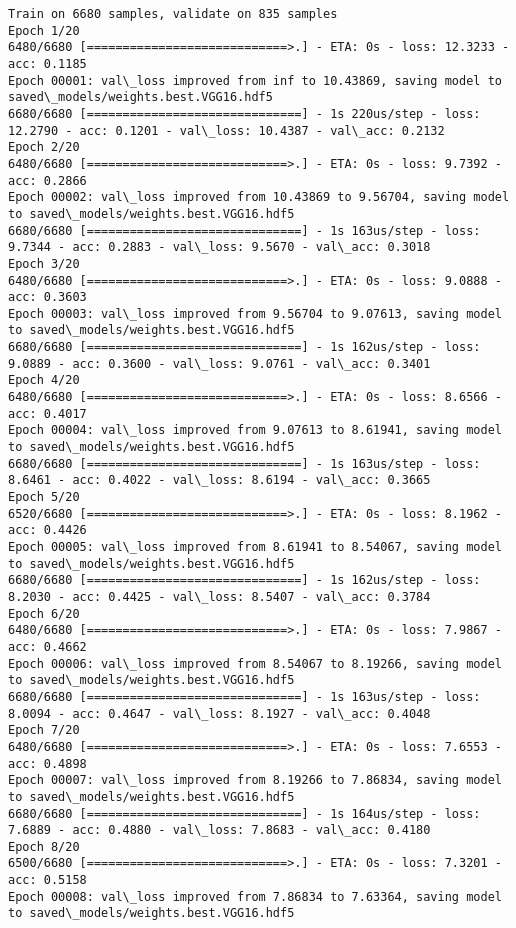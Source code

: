 \documentclass[11pt]{article}
\begin{document}
    \begin{Verbatim}[commandchars=\\\{\}]
Train on 6680 samples, validate on 835 samples
Epoch 1/20
6480/6680 [============================>.] - ETA: 0s - loss: 12.3233 - acc: 0.1185
Epoch 00001: val\_loss improved from inf to 10.43869, saving model to saved\_models/weights.best.VGG16.hdf5
6680/6680 [==============================] - 1s 220us/step - loss: 12.2790 - acc: 0.1201 - val\_loss: 10.4387 - val\_acc: 0.2132
Epoch 2/20
6480/6680 [============================>.] - ETA: 0s - loss: 9.7392 - acc: 0.2866
Epoch 00002: val\_loss improved from 10.43869 to 9.56704, saving model to saved\_models/weights.best.VGG16.hdf5
6680/6680 [==============================] - 1s 163us/step - loss: 9.7344 - acc: 0.2883 - val\_loss: 9.5670 - val\_acc: 0.3018
Epoch 3/20
6480/6680 [============================>.] - ETA: 0s - loss: 9.0888 - acc: 0.3603
Epoch 00003: val\_loss improved from 9.56704 to 9.07613, saving model to saved\_models/weights.best.VGG16.hdf5
6680/6680 [==============================] - 1s 162us/step - loss: 9.0889 - acc: 0.3600 - val\_loss: 9.0761 - val\_acc: 0.3401
Epoch 4/20
6480/6680 [============================>.] - ETA: 0s - loss: 8.6566 - acc: 0.4017
Epoch 00004: val\_loss improved from 9.07613 to 8.61941, saving model to saved\_models/weights.best.VGG16.hdf5
6680/6680 [==============================] - 1s 163us/step - loss: 8.6461 - acc: 0.4022 - val\_loss: 8.6194 - val\_acc: 0.3665
Epoch 5/20
6520/6680 [============================>.] - ETA: 0s - loss: 8.1962 - acc: 0.4426
Epoch 00005: val\_loss improved from 8.61941 to 8.54067, saving model to saved\_models/weights.best.VGG16.hdf5
6680/6680 [==============================] - 1s 162us/step - loss: 8.2030 - acc: 0.4425 - val\_loss: 8.5407 - val\_acc: 0.3784
Epoch 6/20
6480/6680 [============================>.] - ETA: 0s - loss: 7.9867 - acc: 0.4662
Epoch 00006: val\_loss improved from 8.54067 to 8.19266, saving model to saved\_models/weights.best.VGG16.hdf5
6680/6680 [==============================] - 1s 163us/step - loss: 8.0094 - acc: 0.4647 - val\_loss: 8.1927 - val\_acc: 0.4048
Epoch 7/20
6480/6680 [============================>.] - ETA: 0s - loss: 7.6553 - acc: 0.4898
Epoch 00007: val\_loss improved from 8.19266 to 7.86834, saving model to saved\_models/weights.best.VGG16.hdf5
6680/6680 [==============================] - 1s 164us/step - loss: 7.6889 - acc: 0.4880 - val\_loss: 7.8683 - val\_acc: 0.4180
Epoch 8/20
6500/6680 [============================>.] - ETA: 0s - loss: 7.3201 - acc: 0.5158
Epoch 00008: val\_loss improved from 7.86834 to 7.63364, saving model to saved\_models/weights.best.VGG16.hdf5

\end{Verbatim}
\end{document}
